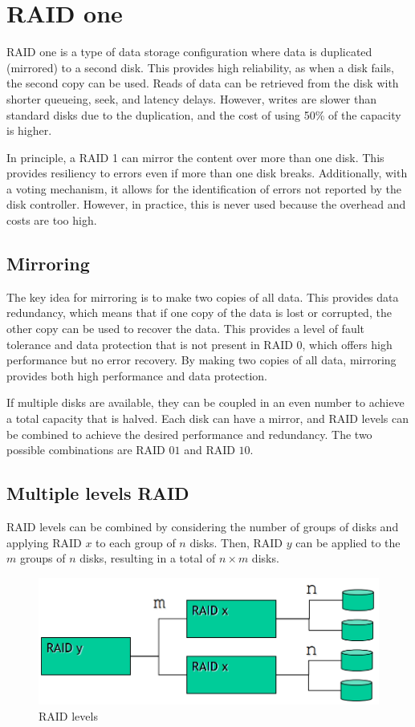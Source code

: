 \section{RAID one}

RAID one is a type of data storage configuration where data is duplicated (mirrored) to a second disk. 
This provides high reliability, as when a disk fails, the second copy can be used. 
Reads of data can be retrieved from the disk with shorter queueing, seek, and latency delays.
However, writes are slower than standard disks due to the duplication, and the cost of using 50\% of the capacity is higher.

In principle, a RAID 1 can mirror the content over more than one disk. 
This provides resiliency to errors even if more than one disk breaks.
Additionally, with a voting mechanism, it allows for the identification of errors not reported by the disk controller. 
However, in practice, this is never used because the overhead and costs are too high.

\subsection{Mirroring}
The key idea for mirroring is to make two copies of all data. 
This provides data redundancy, which means that if one copy of the data is lost or corrupted, the other copy can be used to recover the data. 
This provides a level of fault tolerance and data protection that is not present in RAID 0, which offers high performance but no error recovery.
By making two copies of all data, mirroring provides both high performance and data protection.

If multiple disks are available, they can be coupled in an even number to achieve a total capacity that is halved. 
Each disk can have a mirror, and RAID levels can be combined to achieve the desired performance and redundancy. 
The two possible combinations are RAID $01$ and RAID $10$.

\subsection{Multiple levels RAID}
RAID levels can be combined by considering the number of groups of disks and applying RAID $x$ to each group of $n$ disks. 
Then, RAID $y$ can be applied to the $m$ groups of $n$ disks, resulting in a total of $n \times m$ disks.
\begin{figure}[H]
    \centering
    \includegraphics[width=1\linewidth]{images/level.png}
    \caption{RAID levels}
\end{figure}

